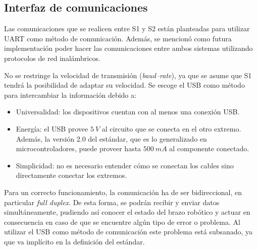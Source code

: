 \subsection{Interfaz de comunicaciones}
Las comunicaciones que se realicen entre \ac{S1} y \ac{S2} están planteadas para utilizar \ac{UART} como método de comunicación. Además, se mencionó como futura implementación poder hacer las comunicaciones entre ambos sistemas utilizando protocolos de red inalámbricos.

No se restringe la velocidad de transmisión (\textit{baud--rate}), ya que se asume que \ac{S1} tendrá la posibilidad de adaptar su velocidad. Se escoge el \ac{USB} como método para intercambiar la información debido a:

\begin{itemize}
    \item Universalidad: los dispositivos cuentan con al menos una conexión \ac{USB}.
    \item Energía: el \ac{USB} provee $5~V$ al circuito que se conecta en el otro extremo. Además, la versión 2.0 del estándar, que es lo generalizado en microcontroladores, puede proveer hasta $500~mA$ al componente conectado.
    \item Simplicidad: no es necesario entender cómo se conectan los cables sino directamente conectar los extremos.
\end{itemize}

Para un correcto funcionamiento, la comunicación ha de ser bidireccional, en particular \textit{full duplex}. De esta forma, se podrán recibir y enviar datos simultáneamente, pudiendo así conocer el estado del brazo robótico y actuar en consecuencia en caso de que se encuentre algún tipo de error o problema. Al utilizar el \ac{USB} como método de comunicación este problema está subsanado, ya que va implícito en la definición del estándar.